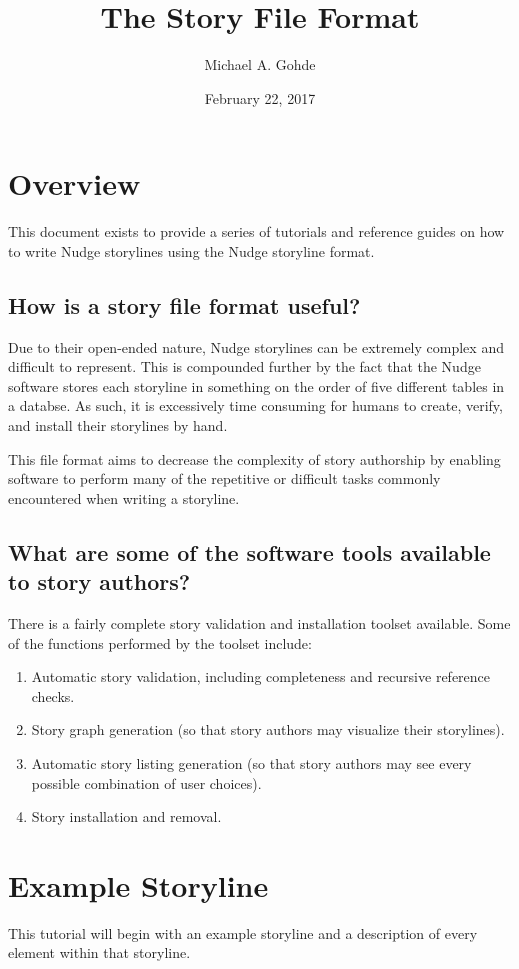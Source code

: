 \documentclass[12pt,letterpaper]{article}
\begin{document}
\title{The Story File Format}
\author{Michael A. Gohde}
\date{February 22, 2017}
\maketitle

\section{Overview}
This document exists to provide a series of tutorials and reference guides on how to write Nudge storylines using the Nudge storyline format.

\subsection{How is a story file format useful?}
Due to their open-ended nature, Nudge storylines can be extremely complex and difficult to represent. This is compounded further by the fact that the Nudge software stores each storyline in something on the order of five different tables in a databse.
As such, it is excessively time consuming for humans to create, verify, and install their storylines by hand. 

This file format aims to decrease the complexity of story authorship by enabling software to perform many of the repetitive or difficult tasks commonly encountered when writing a storyline.

\subsection{What are some of the software tools available to story authors?}
There is a fairly complete story validation and installation toolset available. Some of the functions performed by the toolset include:
    
\begin{enumerate}
 \item Automatic story validation, including completeness and recursive reference checks.
 \item Story graph generation (so that story authors may visualize their storylines).
 \item Automatic story listing generation (so that story authors may see every possible combination of user choices).
 \item Story installation and removal.
\end{enumerate}

\section{Example Storyline}
This tutorial will begin with an example storyline and a description of every element within that storyline.
\end{document}
